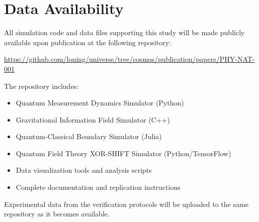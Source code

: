 \documentclass[10pt]{article}
\begin{document}
\section*{Data Availability}

All simulation code and data files supporting this study will be made publicly available upon publication at the following repository:

\url{https://github.com/loning/universe/tree/cosmos/publication/papers/PHY-NAT-001}

The repository includes:
\begin{itemize}
\item Quantum Measurement Dynamics Simulator (Python)
\item Gravitational Information Field Simulator (C++)
\item Quantum-Classical Boundary Simulator (Julia)
\item Quantum Field Theory XOR-SHIFT Simulator (Python/TensorFlow)
\item Data visualization tools and analysis scripts
\item Complete documentation and replication instructions
\end{itemize}

Experimental data from the verification protocols will be uploaded to the same repository as it becomes available.
\end{document}
